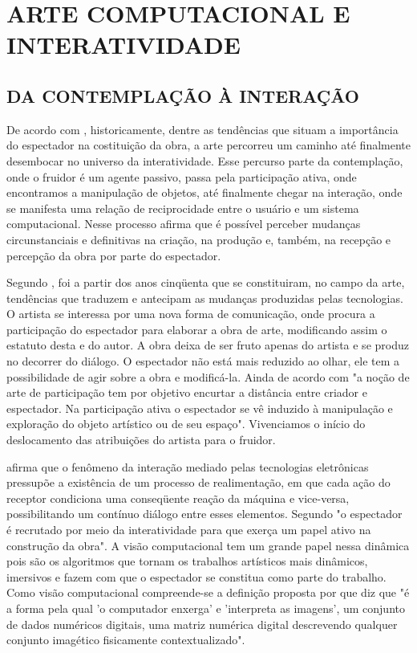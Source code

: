 \chapter{ARTE COMPUTACIONAL E INTERATIVIDADE}

\section{DA CONTEMPLAÇÃO À INTERAÇÃO}

De acordo com , historicamente, dentre as tendências que situam a importância do espectador na costituição da obra, a arte percorreu um caminho até finalmente desembocar no universo da interatividade. Esse percurso parte da contemplação, onde o fruidor é um agente passivo, passa pela participação ativa, onde encontramos a manipulação de objetos, até finalmente chegar na interação, onde se manifesta uma relação de reciprocidade entre o usuário e um sistema computacional. Nesse processo  afirma que é possível perceber mudanças circunstanciais e definitivas na criação, na produção e, também, na recepção e percepção da obra por parte do espectador. 

Segundo , foi a partir dos anos cinqüenta que se constituiram, no campo da arte, tendências que traduzem e antecipam as mudanças produzidas pelas tecnologias. O artista se interessa por uma nova forma de comunicação, onde procura a participação do espectador para elaborar a obra de arte, modificando assim o estatuto desta e do autor. A obra deixa de ser fruto apenas do artista e se produz no decorrer do diálogo. O espectador não está mais reduzido ao olhar, ele tem a possibilidade de agir sobre a obra e modificá-la. Ainda de acordo com  "a noção de arte de participação tem por objetivo encurtar a distância entre criador e espectador. Na participação ativa o espectador se vê induzido à manipulação e exploração do objeto artístico ou de seu espaço". Vivenciamos o início do deslocamento das atribuições do artista para o fruidor. 

 afirma que o fenômeno da interação mediado pelas tecnologias eletrônicas pressupõe a existência de um processo de realimentação, em que cada ação do receptor condiciona uma conseqüente reação da máquina e vice-versa, possibilitando um contínuo diálogo entre esses elementos. Segundo  "o espectador é recrutado por meio da interatividade para que exerça um papel ativo na construção da obra". A visão computacional tem um grande papel nessa dinâmica pois são os algoritmos que tornam os trabalhos artísticos mais dinâmicos, imersivos e fazem com que o espectador se constitua como parte do trabalho. Como visão computacional compreende-se a definição proposta por  que diz que "é a forma pela qual 'o computador enxerga' e 'interpreta as imagens', um conjunto de dados numéricos digitais, uma matriz numérica digital descrevendo qualquer conjunto imagético fisicamente contextualizado".

